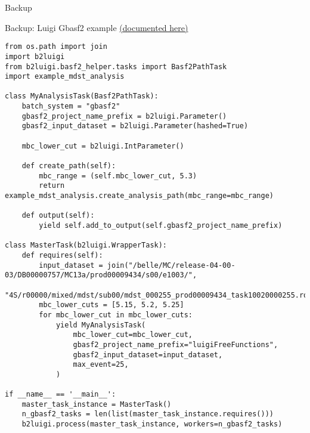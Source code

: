 \documentclass[aspectratio=169, 12pt]{beamer}
\begin{document}
\begin{frame}[label={sec:org38f8181}]{Backup}
\appendix
\end{frame}
\begin{frame}[label={sec:orgdac5cf3},fragile]{Backup: Luigi Gbasf2 example \href{https://meliache.github.io/b2luigi/docs/\_build/html/usage/batch.html\#gbasf2-wrapper-for-lcg}{(documented here)}}
 \lstset{language=Python,label= ,caption= ,captionpos=b,numbers=none,basicstyle=\Tiny\ttfamily, xleftmargin=-5pt}
\begin{lstlisting}
from os.path import join
import b2luigi
from b2luigi.basf2_helper.tasks import Basf2PathTask
import example_mdst_analysis

class MyAnalysisTask(Basf2PathTask):
    batch_system = "gbasf2"
    gbasf2_project_name_prefix = b2luigi.Parameter()
    gbasf2_input_dataset = b2luigi.Parameter(hashed=True)

    mbc_lower_cut = b2luigi.IntParameter()

    def create_path(self):
        mbc_range = (self.mbc_lower_cut, 5.3)
        return example_mdst_analysis.create_analysis_path(mbc_range=mbc_range)

    def output(self):
        yield self.add_to_output(self.gbasf2_project_name_prefix)

class MasterTask(b2luigi.WrapperTask):
    def requires(self):
        input_dataset = join("/belle/MC/release-04-00-03/DB00000757/MC13a/prod00009434/s00/e1003/",
                             "4S/r00000/mixed/mdst/sub00/mdst_000255_prod00009434_task10020000255.root")
        mbc_lower_cuts = [5.15, 5.2, 5.25]
        for mbc_lower_cut in mbc_lower_cuts:
            yield MyAnalysisTask(
                mbc_lower_cut=mbc_lower_cut,
                gbasf2_project_name_prefix="luigiFreeFunctions",
                gbasf2_input_dataset=input_dataset,
                max_event=25,
            )

if __name__ == '__main__':
    master_task_instance = MasterTask()
    n_gbasf2_tasks = len(list(master_task_instance.requires()))
    b2luigi.process(master_task_instance, workers=n_gbasf2_tasks)
\end{lstlisting}
\end{frame}
\end{document}
